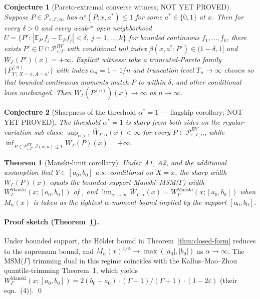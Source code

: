 \documentclass[11pt]{article}
\newcommand{\E}{\mathbb{E}}
\theoremstyle{definition}
\theoremstyle{plain}
\newtheorem{theorem}{Theorem}
\newtheorem{conjecture}{Conjecture}
\theoremstyle{remark}
\begin{document}
\begin{conjecture}[Pareto-extremal converse witness; NOT YET PROVED]\label{conj:witness}
Suppose $P\in\mathcal{P}_{\varepsilon,\Gamma,\infty}$ has $\alpha^{\star}(P;x,a^{*})\le 1$ for some $a^{*}\in\{0,1\}$ at $x$. Then for every $\delta>0$ and every weak-$*$ open neighborhood $U=\{P':\,|\E_{P'}f_j-\E_Pf_j|<\delta,\ j=1,\dots,k\}$ for bounded continuous $f_1,\dots,f_k$, there exists $P'\in U\cap\mathcal{P}^{RV}_{\varepsilon,\Gamma}$ with conditional tail index $\beta(x,a^{*};P')\in(1-\delta,1]$ and $W_{\Gamma}(P')(x)=+\infty$. Explicit witness: take a truncated-Pareto family $\{P^{(n)}_{Y\mid X=x,A=a^{*}}\}$ with index $\alpha_n=1+1/n$ and truncation level $T_n\to\infty$ chosen so that bounded-continuous moments match $P$ to within $\delta$, and other conditional laws unchanged. Then $W_{\Gamma}(P^{(n)})(x)\to\infty$ as $n\to\infty$.
\end{conjecture}

\begin{conjecture}[Sharpness of the threshold $\alpha^{*}=1$ --- flagship corollary; NOT YET PROVED]\label{conj:threshold-sharp}
The threshold $\alpha^{*}=1$ is sharp from both sides on the regular-variation sub-class:
$\sup_{\alpha>1}\overline{W}_{\Gamma,\alpha}(x)<\infty$ for every $P\in\mathcal{P}^{RV}_{\varepsilon,\Gamma,\alpha}$, while $\inf_{P\in\mathcal{P}^{RV}_{\varepsilon,\Gamma}:\beta(x,a)\le 1}W_{\Gamma}(P)(x)=+\infty$.
\end{conjecture}

\begin{theorem}[Manski-limit corollary]\label{thm:manski-limit}
Under A1, A2, and the additional assumption that $Y\in[a_{0},b_{0}]$ a.s.\ conditional on $X=x$, the sharp width $W_{\Gamma}(P)(x)$ equals the bounded-support Manski--MSM($\Gamma$) width $W^{\mathrm{Manski}}_{\Gamma}(x;[a_{0},b_{0}])$ of \citet[Theorem~1]{KallusMaoZhou2019CATEIntervals}, and $\lim_{\alpha\to\infty}\overline{W}_{\Gamma,\alpha}(x)=W^{\mathrm{Manski}}_{\Gamma}(x;[a_{0},b_{0}])$ when $M_{\alpha}(x)$ is taken as the tightest $\alpha$-moment bound implied by the support $[a_{0},b_{0}]$.
\end{theorem}

\paragraph{Proof sketch (Theorem~\ref{thm:manski-limit}).}
Under bounded support, the Hölder bound in Theorem~\ref{thm:closed-form} reduces to the supremum bound, and $M_{\alpha}(x)^{1/\alpha}\to\max(|a_{0}|,|b_{0}|)$ as $\alpha\to\infty$. The MSM($\Gamma$) trimming dual in this regime coincides with the Kallus--Mao--Zhou quantile-trimming Theorem~1, which yields $W^{\mathrm{Manski}}_{\Gamma}(x;[a_{0},b_{0}])=2(b_{0}-a_{0})\cdot(\Gamma-1)/(\Gamma+1)\cdot(1-2\varepsilon)$ (their eqn.\ (4)). \qed
\end{document}
